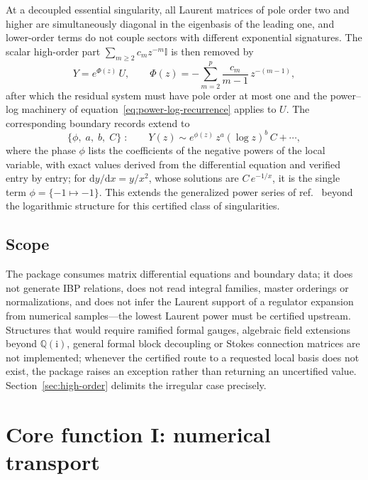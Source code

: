 \documentclass[11pt,a4paper]{article}
\newcommand{\dd}{\mathrm d}
\newcommand{\ii}{\mathrm i}
\newcommand{\Id}{\mathbb I}
\begin{document}
At a decoupled essential singularity, all Laurent matrices of pole order two and higher
are simultaneously diagonal in the eigenbasis of the leading one, and lower-order terms
do not couple sectors with different exponential signatures. The scalar high-order part
$\sum_{m\ge2}c_mz^{-m}\Id$ is then removed by
\begin{equation}
  Y=e^{\Phi(z)}\,U,\qquad
  \Phi(z)=-\sum_{m=2}^{p}\frac{c_m}{m-1}\,z^{-(m-1)},
  \label{eq:implemented-exponential-factor}
\end{equation}
after which the residual system must have pole order at most one and the power--log
machinery of equation~\eqref{eq:power-log-recurrence} applies to $U$. The corresponding
boundary records extend to
\begin{equation}
  \{\phi,\;a,\;b,\;C\}\;:\qquad Y(z)\sim e^{\phi(z)}\,z^{a}(\log z)^{b}\,C+\cdots,
  \label{eq:exponential-boundary-record}
\end{equation}
where the phase $\phi$ lists the coefficients of the negative powers of the local
variable, with exact values derived from the differential equation and verified entry by
entry; for $\dd y/\dd x=y/x^{2}$, whose solutions are $C\,e^{-1/x}$, it is the single term
$\phi=\{-1\mapsto-1\}$. This
extends the generalized power series of ref.~\cite{Moriello:2019yhu} beyond the
logarithmic structure for this certified class of singularities.

\subsection{Scope}
\label{sec:scope}

The package consumes matrix differential equations and boundary data; it does not generate
IBP relations, does not read integral families, master orderings or normalizations, and
does not infer the Laurent support of a regulator expansion from numerical samples---the
lowest Laurent power must be certified upstream. Structures that would require
ramified formal gauges, algebraic field extensions beyond $\mathbb Q(\ii)$, general formal
block decoupling or Stokes connection matrices are not implemented; whenever the certified
route to a requested local basis does not exist, the package raises an exception rather
than returning an uncertified value. Section~\ref{sec:high-order} delimits the irregular
case precisely.

\section{Core function I: numerical transport}
\label{sec:transport}
\end{document}
